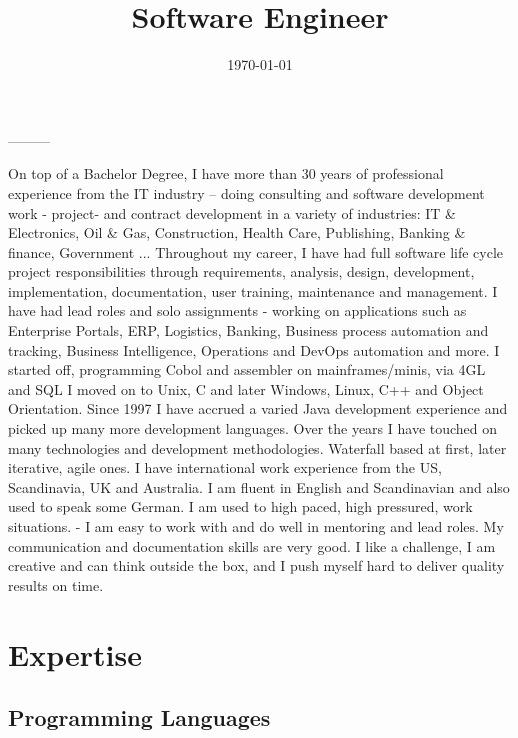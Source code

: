 \documentclass[11pt,a4paper,sans]{moderncv} %
\title{Software Engineer}
\begin{document}
\makecvtitle
\date{\today} %
\closing{---------}


On top of a Bachelor Degree, I have more than 30 years of professional
experience from the IT industry – doing consulting and software
development work - project- and contract development in a
variety of industries: IT \& Electronics, Oil \& Gas, Construction, Health
Care, Publishing, Banking \& finance, Government ...
\newline{}
\newline{}
Throughout my career, I have had full software life cycle project
responsibilities through requirements, analysis, design, development,
implementation, documentation, user training, maintenance and
management. I have had lead roles and solo assignments - working on
applications such as  Enterprise Portals, ERP, Logistics, Banking,
Business process automation and tracking, Business Intelligence, 
Operations and DevOps automation and more. 
\newline{}
\newline{}
I started off, programming Cobol and assembler on mainframes/minis, via
4GL and SQL I moved on to Unix, C and later Windows, Linux, C++ and Object
Orientation. Since 1997 I have accrued a varied Java development
experience and picked up many more development languages. 
Over the years I have touched on many technologies and development methodologies. 
Waterfall based at first, later iterative, agile ones.  
\newline{}
\newline{}
I have international work experience from the
US, Scandinavia, UK and Australia. I am fluent in English and
Scandinavian and also used to speak some German.
\newline{}
\newline{}
I am used to high paced, high pressured, work situations.  - I am easy
to work with and do well in mentoring and lead roles. My communication
and documentation skills are very good.  I like a challenge, I am
creative and can think outside the box, and I push myself hard to
deliver quality results on time.

\makeletterclosing
\pagebreak

\section{Expertise}
\subsection{Programming Languages}
\end{document}
